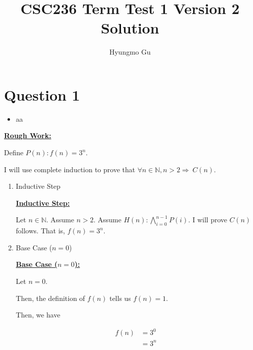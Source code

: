 \documentclass[12pt]{article}
\begin{document}
\title{CSC236 Term Test 1 Version 2 Solution}
\author{Hyungmo Gu}
\maketitle

\section*{Question 1}
\begin{itemize}
    \item

    aa
\end{itemize}

\bigskip

\begin{mdframed}
    \underline{\textbf{Rough Work:}}

    \bigskip

    Define $P(n):f(n) = 3^n$.

    \bigskip

    I will use complete induction to prove that $\forall n \in \mathbb{N}, n > 2 \Rightarrow \:C(n)$.

    \begin{enumerate}[1.]
        \item Inductive Step

        \begin{mdframed}
        \underline{\textbf{Inductive Step:}}

        \bigskip

        Let $n \in \mathbb{N}$. Assume $n > 2$. Assume
        $H(n):\bigwedge\limits_{i=0}^{n-1} P(i)$. I will prove $C(n)$ follows.
        That is, $f(n) = 3^n$.
        \end{mdframed}

        \item Base Case ($n = 0$)

        \begin{mdframed}
        \underline{\textbf{Base Case ($n = 0$):}}

        \bigskip

        Let $n = 0$.

        \bigskip

        Then, the definition of $f(n)$ tells us $f(n) = 1$.

        \bigskip

        Then, we have

        \begin{align}
            f(n) &= 3^0\\
            &= 3^n
        \end{align}


\end{mdframed}
\end{enumerate}
\end{mdframed}
\end{document}
